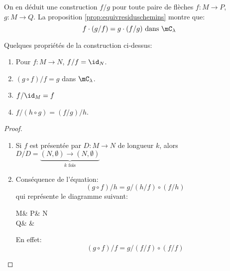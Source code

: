\documentclass[math, info]{cours}
\def\clam{\mC_{\lambda}}
\begin{document}
On en déduit une construction $f/g$ pour toute paire de flèches $f: M \to P$, $g: M\to Q$.
La proposition \ref{prop:equivresiduschemins} montre que:
\begin{equation*}
	f \cdot (g/f) = g\cdot (f/g) \text{ dans } \clam
\end{equation*}
\begin{proposition}
	Quelques propriétés de la construction ci-dessus:
	\begin{enumerate}
		\item Pour $f: M \to N$, $f / f = \id_{N}$.
		\item $(g \circ f) / f = g$ dans $\clam$.
		\item $f / \id_{M} = f$
		\item $f / (h\circ g) = (f / g) / h$.
	\end{enumerate}
	\label{prop:proprieteresidufleche}
\end{proposition}
\begin{proof}
	\begin{enumerate}
		\item Si $f$ est présentée par $D : M \to N$ de longueur $k$, alors $D / D = \underbrace{(N, \emptyset)\to (N, \emptyset)}_{k \text{ fois}}$
		\item Conséquence de l'équation:
			\begin{equation*}
				(g \circ f) / h = g / (h / f) \circ (f/h)
			\end{equation*}
			qui représente le diagramme suivant:
			\begin{category}
				M\ar[d, "h"]\ar[r, "f"] & P\ar[d, "h/f"]\ar[r, "g"] & N\ar[d]\\
				Q\ar[r, "f/h"'] & \phantom{}\ar[r, "g / (h/f)"'] & \phantom{}
			\end{category}
			En effet:
			\begin{equation*}
				(g \circ f) / f = g / (f / f) \circ (f / f)
			\end{equation*}
	\end{enumerate}
\end{proof}
\end{document}
